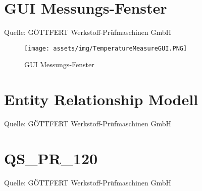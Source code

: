 \section{GUI Messungs-Fenster}
Quelle: GÖTTFERT Werkstoff-Prüfmaschinen GmbH
\begin{figure}[ht]
    \begin{center}
        \texttt{[image: assets/img/TemperatureMeasureGUI.PNG]}
        \caption{GUI Messungs-Fenster}
        \label{gui_temperatureMeasure}
    \end{center}
\end{figure}
\clearpage

\section{Entity Relationship Modell} \label{erm_gft40}
Quelle: GÖTTFERT Werkstoff-Prüfmaschinen GmbH

\clearpage

\section{QS\_PR\_120} \label{qs_pr_120}
Quelle: GÖTTFERT Werkstoff-Prüfmaschinen GmbH

\clearpage

